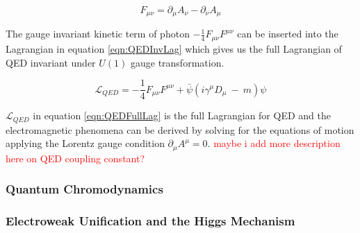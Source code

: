 \begin{equation}
F_{\mu\nu} = \partial_{\mu}A_{\nu} - \partial_{\nu}A_{\mu}
\label{QEDFieldTensor}
\end{equation}

The gauge invariant kinetic term of photon $-\frac{1}{4}F_{\mu\nu}F^{\mu\nu}$ can be inserted into the Lagrangian in equation \ref{eqn:QEDInvLag} which gives us the full Lagrangian of QED invariant under $U(1)$ gauge transformation. 

\begin{equation}
\mathcal{L}_{QED} = -\frac{1}{4}F_{\mu\nu}F^{\mu\nu} + \bar{\psi} ( i \gamma^{\mu} D_{\mu} ~-~ m) \psi
\label{eqn:QEDFullLag}
\end{equation}

$\mathcal{L}_{QED}$ in equation \ref{eqn:QEDFullLag} is the full Lagrangian for QED and the electromagnetic phenomena can be derived by solving for the equations of motion applying the Lorentz gauge condition $\partial_{\mu}A^{\mu}=0$. 
\textcolor{red}{maybe i add more description here on QED coupling constant?}


\subsubsection{Quantum Chromodynamics }
\label{subsubsec:QCD}

\subsubsection{Electroweak Unification and the Higgs Mechanism}
\label{subsubsec:EWkUni}

